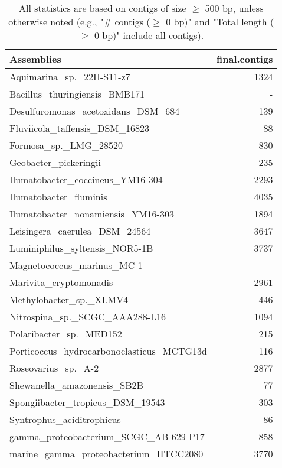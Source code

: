 \documentclass[12pt,a4paper]{article}
\begin{document}
\begin{table}[ht]
\begin{center}
\caption{All statistics are based on contigs of size $\geq$ 500 bp, unless otherwise noted (e.g., "\# contigs ($\geq$ 0 bp)" and "Total length ($\geq$ 0 bp)" include all contigs).}
\begin{tabular}{|l*{1}{|r}|}
\hline
Assemblies & final.contigs \\ \hline
Aquimarina\_sp.\_22II-S11-z7 & 1324 \\ \hline
Bacillus\_thuringiensis\_BMB171 & - \\ \hline
Desulfuromonas\_acetoxidans\_DSM\_684 & 139 \\ \hline
Fluviicola\_taffensis\_DSM\_16823 & 88 \\ \hline
Formosa\_sp.\_LMG\_28520 & 830 \\ \hline
Geobacter\_pickeringii & 235 \\ \hline
Ilumatobacter\_coccineus\_YM16-304 & 2293 \\ \hline
Ilumatobacter\_fluminis & 4035 \\ \hline
Ilumatobacter\_nonamiensis\_YM16-303 & 1894 \\ \hline
Leisingera\_caerulea\_DSM\_24564 & 3647 \\ \hline
Luminiphilus\_syltensis\_NOR5-1B & 3737 \\ \hline
Magnetococcus\_marinus\_MC-1 & - \\ \hline
Marivita\_cryptomonadis & 2961 \\ \hline
Methylobacter\_sp.\_XLMV4 & 446 \\ \hline
Nitrospina\_sp.\_SCGC\_AAA288-L16 & 1094 \\ \hline
Polaribacter\_sp.\_MED152 & 215 \\ \hline
Porticoccus\_hydrocarbonoclasticus\_MCTG13d & 116 \\ \hline
Roseovarius\_sp.\_A-2 & 2877 \\ \hline
Shewanella\_amazonensis\_SB2B & 77 \\ \hline
Spongiibacter\_tropicus\_DSM\_19543 & 303 \\ \hline
Syntrophus\_aciditrophicus & 86 \\ \hline
gamma\_proteobacterium\_SCGC\_AB-629-P17 & 858 \\ \hline
marine\_gamma\_proteobacterium\_HTCC2080 & 3770 \\ \hline
\end{tabular}
\end{center}
\end{table}
\end{document}
